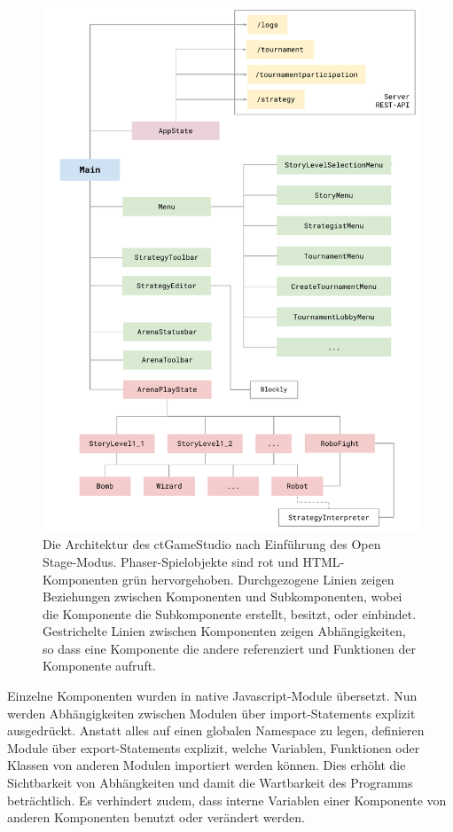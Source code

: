 \begin{figure}
  \label{architektur}

  \caption{Die Architektur des ctGameStudio nach Einführung des Open Stage-Modus.
  Phaser-Spielobjekte sind rot und HTML-Komponenten grün hervorgehoben. Durchgezogene Linien zeigen
  Beziehungen zwischen Komponenten und Subkomponenten, wobei die Komponente die Subkomponente
  erstellt, besitzt, oder einbindet. Gestrichelte Linien zwischen Komponenten zeigen Abhängigkeiten,
  so dass eine Komponente die andere referenziert und Funktionen der Komponente aufruft.}

  \includegraphics{figures/architektur.pdf}
\end{figure}

Einzelne Komponenten wurden in native Javascript-Module übersetzt. Nun werden Abhängigkeiten
zwischen Modulen über import-Statements explizit ausgedrückt. Anstatt alles auf einen globalen
Namespace zu legen, definieren Module über export-Statements explizit, welche Variablen, Funktionen
oder Klassen von anderen Modulen importiert werden können. Dies erhöht die Sichtbarkeit von
Abhängkeiten und damit die Wartbarkeit des Programms beträchtlich. Es verhindert zudem, dass interne
Variablen einer Komponente von anderen Komponenten benutzt oder verändert werden.

